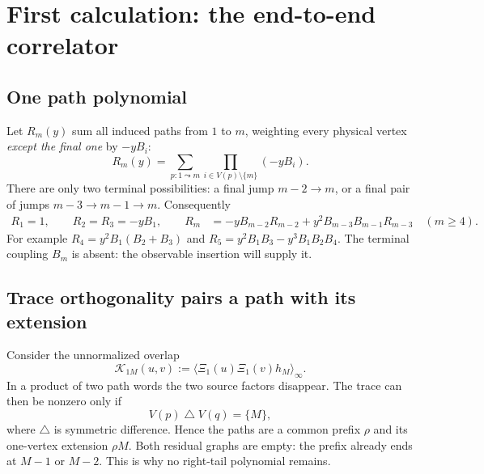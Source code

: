 \documentclass[11pt,a4paper]{article}
\newcommand{\av}[1]{\langle #1\rangle_\infty}
\newcommand{\Kern}{\mathcal K}
\begin{document}
\section{First calculation: the end-to-end correlator}
\subsection{One path polynomial}
Let $R_m(y)$ sum all induced paths from $1$ to $m$, weighting every physical vertex \emph{except the final one} by $-yB_i$:
\begin{equation}
 R_m(y)=\sum_{p:1\leadsto m}\prod_{i\in V(p)\setminus\{m\}}(-yB_i).
 \label{eq:R}
\end{equation}
There are only two terminal possibilities: a final jump $m-2\to m$, or a final pair of jumps $m-3\to m-1\to m$. Consequently
\begin{align}
 R_1=1,\qquad R_2=R_3=-yB_1,\qquad
 R_m&=-yB_{m-2}R_{m-2}+y^2B_{m-3}B_{m-1}R_{m-3}
 \quad(m\ge4).
 \label{eq:Rrec}
\end{align}
For example $R_4=y^2B_1(B_2+B_3)$ and
$R_5=y^2B_1B_3-y^3B_1B_2B_4$. The terminal coupling $B_m$ is absent: the observable insertion will supply it.

\subsection{Trace orthogonality pairs a path with its extension}
Consider the unnormalized overlap
\begin{equation}
 \Kern_{1M}(u,v):=\av{\Xi_1(u)\Xi_1(v)h_M}.
\end{equation}
In a product of two path words the two source factors disappear. The trace can then be nonzero only if
\begin{equation}
 V(p)\mathbin{\triangle}V(q)=\{M\},
 \label{eq:selection}
\end{equation}
where $\triangle$ is symmetric difference. Hence the paths are a common prefix $\rho$ and its one-vertex extension $\rho M$. Both residual graphs are empty: the prefix already ends at $M-1$ or $M-2$. This is why no right-tail polynomial remains.
\end{document}
